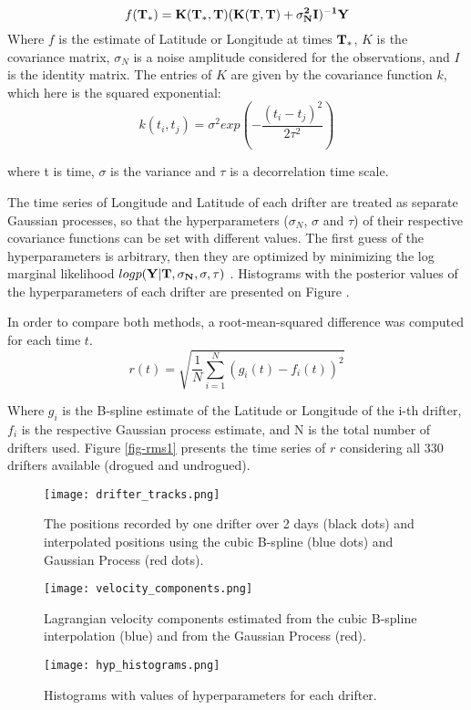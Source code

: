 \documentclass[12pt,a4paper]{article}%
\begin{document}
\begin{equation}
 f(\bf{T_*}) = K(\bf{T_*},\bf{T})(K(\bf{T},\bf{T}) + \sigma_N^2I)^{-1}Y 
\end{equation}
Where $f$ is the estimate of Latitude or Longitude at times $\bf{T_*}$, $K$ is the covariance matrix, 
$\sigma_N$ is a noise amplitude considered for the observations, and $I$ is the identity matrix. 
The entries of $K$ are given by the covariance function $k$, which here is the squared exponential:
\begin{equation}
 k(t_i,t_j) = \sigma^2 exp(-\frac{(t_i-t_j)^2}{2\tau^2}) 
\end{equation}

where t is time, $\sigma$ is the variance and $\tau$ is a decorrelation time scale. 

The time series of Longitude and Latitude of each drifter are 
treated as separate Gaussian processes, so that the hyperparameters ($\sigma_N$, $\sigma$ and $\tau$) of 
their respective covariance functions can be set with different values. 
The first guess of the hyperparameters is arbitrary, then they are optimized by minimizing the log marginal 
likelihood $log p(\bf{Y}|\bf{T},\sigma_N,\sigma,\tau)$ \citep{Rasmussen2006}. Histograms with the posterior 
values of the hyperparameters of each drifter are presented on Figure .

In order to compare both methods, a root-mean-squared difference was computed for each time $t$.
\begin{equation}
 r(t) = \sqrt{\frac{1}{N}\sum_{i=1}^N(g_i(t) - f_i(t))^2}
\end{equation}

Where $g_i$ is the B-spline estimate of the Latitude or Longitude of the i-th drifter, $f_i$ is the 
respective Gaussian process estimate, and N is the total number of drifters used. Figure \ref{fig-rms1} 
presents the time series of $r$ considering all 330 drifters available (drogued and undrogued). 



\begin{figure}
\noindent\texttt{[image: drifter\_tracks.png]}
\caption{The positions recorded by one drifter over 2 days (black dots) and interpolated 
positions using the cubic B-spline (blue dots) and Gaussian Process (red dots).}
\label{fig-track}
\end{figure}

\begin{figure}
\noindent\texttt{[image: velocity\_components.png]}
\caption{Lagrangian velocity components estimated from the cubic B-spline interpolation (blue) 
and from the Gaussian Process (red).}
\label{fig-track}
\end{figure}

\begin{figure}
\noindent\texttt{[image: hyp\_histograms.png]}
\caption{Histograms with values of hyperparameters for each drifter.  }
\label{fig-hyperparam}
\end{figure}
\end{document}

